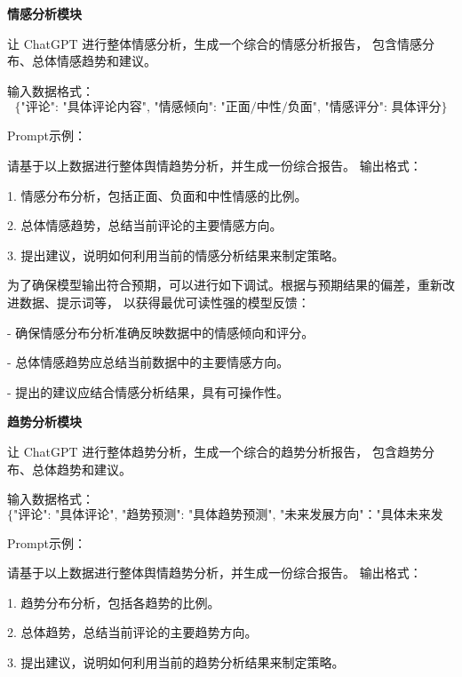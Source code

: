 \documentclass[UTF8,a4paper,15pt,titlepage,oneside]{ctexbook}
\begin{document}
\vskip 0.2cm
\noindent
\textbf{情感分析模块}

让 ChatGPT 进行整体情感分析，生成一个综合的情感分析报告，
包含情感分布、总体情感趋势和建议。

输入数据格式：
\begin{equation}
  \text{{\{"评论": "具体评论内容", "情感倾向": "正面/中性/负面", "情感评分": 具体评分\}}}
\end{equation}

Prompt示例：

\begin{mdframed}[backgroundcolor=lightgray!20, linecolor=darkgray, linewidth=1pt]
请基于以上数据进行整体舆情趋势分析，并生成一份综合报告。
输出格式：

1. 情感分布分析，包括正面、负面和中性情感的比例。

2. 总体情感趋势，总结当前评论的主要情感方向。

3. 提出建议，说明如何利用当前的情感分析结果来制定策略。
\end{mdframed}

	为了确保模型输出符合预期，可以进行如下调试。根据与预期结果的偏差，重新改进数据、提示词等，
  以获得最优可读性强的模型反馈：

  - 确保情感分布分析准确反映数据中的情感倾向和评分。

  - 总体情感趋势应总结当前数据中的主要情感方向。

  - 提出的建议应结合情感分析结果，具有可操作性。
  

\vskip 0.2cm
\noindent
\textbf{趋势分析模块}

让 ChatGPT 进行整体趋势分析，生成一个综合的趋势分析报告，
包含趋势分布、总体趋势和建议。

输入数据格式：
\begin{equation}
  \text{{\{"评论": "具体评论", "趋势预测": "具体趋势预测", "未来发展方向"："具体未来发展方向","趋势评分": 8\}}}
\end{equation}

Prompt示例：

\begin{mdframed}[backgroundcolor=lightgray!20, linecolor=darkgray, linewidth=1pt]
请基于以上数据进行整体舆情趋势分析，并生成一份综合报告。
输出格式：

1. 趋势分布分析，包括各趋势的比例。

2. 总体趋势，总结当前评论的主要趋势方向。

3. 提出建议，说明如何利用当前的趋势分析结果来制定策略。
\end{mdframed}
\end{document}
